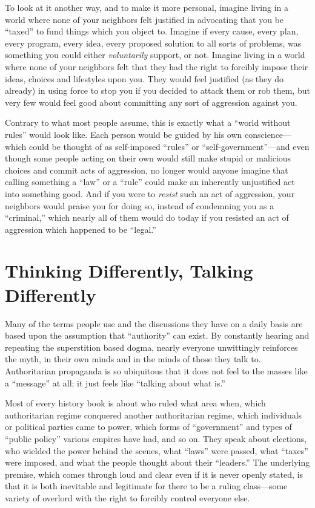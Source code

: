 \documentclass{book}
\begin{document}
To look at it another way, and to make it more personal, imagine living in a world where none of your neighbors felt justified in advocating that you be \enquote{taxed} to fund things which you object to. Imagine if every cause, every plan, every program, every idea, every proposed solution to all sorts of problems, was something you could either \emph{voluntarily} support, or not. Imagine living in a world where none of your neighbors felt that they had the right to forcibly impose their ideas, choices and lifestyles upon you. They would feel justified (as they do already) in using force to stop you if you decided to attack them or rob them, but very few would feel good about committing any sort of aggression against you.

Contrary to what most people assume, this is exactly what a \enquote{world without rules} would look like. Each person would be guided by his own conscience---which could be thought of as self-imposed \enquote{rules} or \enquote{self-government}---and even though some people acting on their own would still make stupid or malicious choices and commit acts of aggression, no longer would anyone imagine that calling something a \enquote{law} or a \enquote{rule} could make an inherently unjustified act into something good. And if you were to \emph{resist} such an act of aggression, your neighbors would praise you for doing so, instead of condemning you as a \enquote{criminal,} which nearly all of them would do today if you resisted an act of aggression which happened to be \enquote{legal.}

\section{Thinking Differently, Talking Differently}

Many of the terms people use and the discussions they have on a daily basis are based upon the assumption that \enquote{authority} can exist. By constantly hearing and repeating the superstition based dogma, nearly everyone unwittingly reinforces the myth, in their own minds and in the minds of those they talk to. Authoritarian propaganda is so ubiquitous that it does not feel to the masses like a \enquote{message} at all; it just feels like \enquote{talking about what is.}

Most of every history book is about who ruled what area when, which authoritarian regime conquered another authoritarian regime, which individuals or political parties came to power, which forms of \enquote{government} and types of \enquote{public policy} various empires have had, and so on. They speak about elections, who wielded the power behind the scenes, what \enquote{laws} were passed, what \enquote{taxes} were imposed, and what the people thought about their \enquote{leaders.} The underlying premise, which comes through loud and clear even if it is never openly stated, is that it is both inevitable and legitimate for there to be a ruling class---some variety of overlord with the right to forcibly control everyone else.
\end{document}

